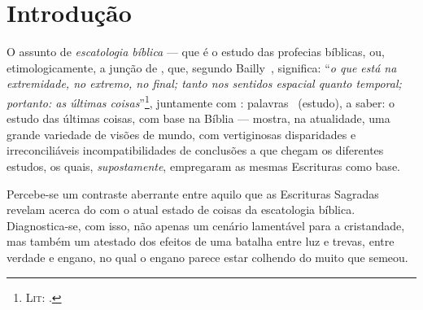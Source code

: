 \setlength{\parskip}{0.5\baselineskip}



\section{Introdução}

    O assunto de \emph{escatologia bíblica} --- que é o estudo  das  profecias  bíblicas,  ou,  etimologicamente,  a  junção  de
    ,  que,  segundo  Bailly~\cite[pp.~817--8]{2000-BaillyA-Hachette},  significa:  ``\textit{o   que   está   na
    extremidade,  no  extremo,   no   final;   tanto   nos   sentidos   espacial   quanto   temporal;   portanto:   as   últimas
    coisas\/}''\footnote{\textsc{Lit}: .},    juntamente    com    :
    palavras~\cite{1997-ManiatoglouMPF-Porto} (estudo), a saber: o estudo das últimas coisas, com base na Bíblia --- mostra,  na
    atualidade, uma grande variedade de visões de mundo, com vertiginosas disparidades e irreconciliáveis incompatibilidades  de
    conclusões a que chegam os diferentes estudos, os quais, \emph{supostamente}, empregaram as mesmas Escrituras como base.

    Percebe-se um contraste aberrante entre  aquilo  que  as  Escrituras  Sagradas  revelam  acerca  do   com o atual estado de coisas da escatologia bíblica. Di\-a\-gnos\-ti\-ca-se, com isso, não  apenas
    um cenário lamentável para a cristandade, mas também um atestado dos efeitos de  uma  batalha  entre  luz  e  trevas,  entre
    verdade e engano, no qual o engano parece estar colhendo do muito que semeou.

